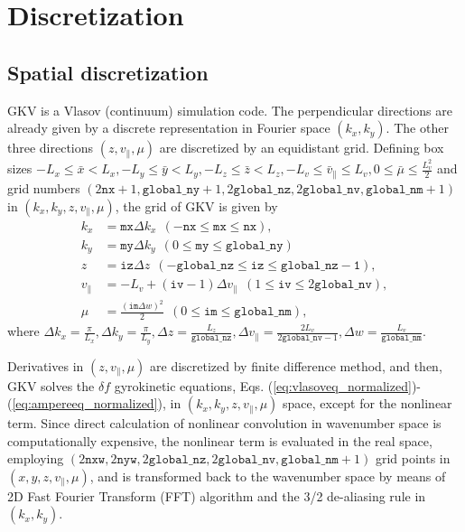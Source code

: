 \chapter{Discretization}
\label{chap:Discretization}

\section{Spatial discretization}
\label{sec:Spatial discretization}
GKV is a Vlasov (continuum) simulation code. The perpendicular directions are already given by a discrete representation in Fourier space $(k_x, k_y)$. The other three directions $(z,v_\parallel,\mu)$ are discretized by an equidistant grid. Defining box sizes $-L_x \leq \bar{x} < L_x, -L_y \leq \bar{y} < L_y, -L_z \leq \bar{z} < L_z, -L_v \leq \bar{v}_\parallel \leq L_v, 0 \leq \bar{\mu} \leq \frac{L_v^2}{2}$ and grid numbers $(2\mathtt{nx}+1,\mathtt{global\_ny}+1,2\mathtt{global\_nz},2\mathtt{global\_nv},\mathtt{global\_nm}+1)$ in $(k_x,k_y,z,v_\parallel,\mu)$, the grid of GKV is given by
\begin{align}
k_x &= \mathtt{mx} \Delta k_x ~~(-\mathtt{nx} \leq \mathtt{mx} \leq \mathtt{nx}), \nonumber \\
k_y &= \mathtt{my} \Delta k_y ~~(0 \leq \mathtt{my} \leq \mathtt{global\_ny}) \nonumber \\
z &= \mathtt{iz} \Delta z ~~(-\mathtt{global\_nz} \leq \mathtt{iz} \leq \mathtt{global\_nz-1}), \nonumber \\
v_\parallel &= -L_v + (\mathtt{iv}-1) \Delta v_\parallel ~~(1 \leq \mathtt{iv} \leq 2\mathtt{global\_nv}), \nonumber \\
\mu &= \frac{(\mathtt{im} \Delta w)^2}{2} ~~(0 \leq \mathtt{im} \leq \mathtt{global\_nm}), \nonumber
\end{align}
where $\Delta k_x = \frac{\pi}{L_x}, \Delta k_y = \frac{\pi}{L_y}, \Delta z = \frac{L_z}{\mathtt{global\_nz}}, \Delta v_\parallel = \frac{2L_v}{2\mathtt{global\_nv}-1}, \Delta w = \frac{L_v}{\mathtt{global\_nm}}$.

Derivatives in $(z,v_\parallel,\mu)$ are discretized by finite difference method, and then, GKV solves the $\delta f$ gyrokinetic equations, Eqs. (\ref{eq:vlasoveq_normalized})-(\ref{eq:ampereeq_normalized}), in $(k_x,k_y,z,v_\parallel,\mu)$ space, except for the nonlinear term. Since direct calculation of nonlinear convolution in wavenumber space is computationally expensive, the nonlinear term is evaluated in the real space, employing $(2\mathtt{nxw},2\mathtt{nyw},2\mathtt{global\_nz},2\mathtt{global\_nv},\mathtt{global\_nm}+1)$ grid points in $(x,y,z,v_\parallel,\mu)$, and is transformed back to the wavenumber space by means of 2D Fast Fourier Transform (FFT) algorithm and the 3/2 de-aliasing rule in $(k_x, k_y)$.

